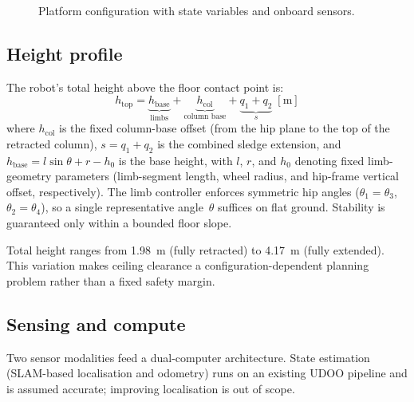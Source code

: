 \documentclass[11pt,a4paper]{article}
\newcommand{\htop}{h_{\text{top}}}
\newcommand{\hbase}{h_{\text{base}}}
\begin{document}
\begin{figure}[t]
  \centering
  \resizebox{0.8\linewidth}{!}{}
  \caption{Platform configuration with state variables and onboard sensors.}
  \label{fig:platform}
\end{figure}

\subsection{Height profile}

The robot's total height above the floor contact point is:
%
\begin{equation}
    \htop = \underbrace{\hbase}_{\text{limbs}} + \underbrace{h_{\text{col}}}_{\text{column base}} + \underbrace{q_1 + q_2}_{s} \; [\si{\metre}]
    \label{eq:htop}
\end{equation}
%
where $h_{\text{col}}$ is the fixed column-base offset (from the hip plane to the top of the retracted column), $s = q_1 + q_2$ is the combined sledge extension, and $\hbase = l\sin\theta + r - h_0$ is the base height, with $l$, $r$, and $h_0$ denoting fixed limb-geometry parameters (limb-segment length, wheel radius, and hip-frame vertical offset, respectively). The limb controller enforces symmetric hip angles ($\theta_1 = \theta_3$, $\theta_2 = \theta_4$), so a single representative angle~$\theta$ suffices on flat ground. Stability is guaranteed only within a bounded floor slope.

Total height ranges from \SI{1.98}{\metre} (fully retracted) to \SI{4.17}{\metre} (fully extended). This variation makes ceiling clearance a configuration-dependent planning problem rather than a fixed safety margin.

\subsection{Sensing and compute}
Two sensor modalities feed a dual-computer architecture. State estimation (SLAM-based localisation and odometry) runs on an existing UDOO pipeline and is assumed accurate; improving localisation is out of scope.
\end{document}

